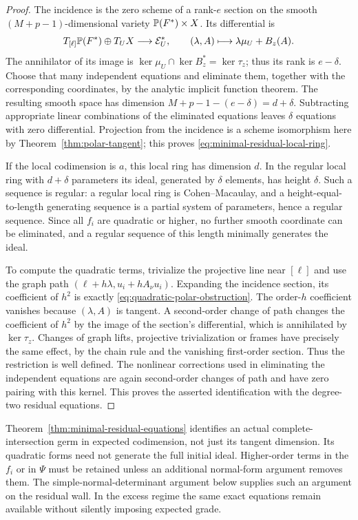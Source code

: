 \begin{proof}
The incidence is the zero scheme of a rank-$e$ section on the smooth
$(M+p-1)$-dimensional variety $\mathbb P(F^*)\times X$.
Its differential is
\[
 T_{[\ell]}\mathbb P(F^*)\oplus T_UX\longrightarrow\mathcal E_U^*,
       \qquad (\lambda,A)\longmapsto\lambda\mu_U+B_z(A).
\]
The annihilator of its image is
$\ker\mu_U\cap\ker B_z^*=\ker\tau_z$; thus its rank is
$e-\delta$. Choose that many independent equations and eliminate
them, together with the corresponding coordinates, by the analytic
implicit function theorem. The resulting smooth space has dimension
$M+p-1-(e-\delta)=d+\delta$. Subtracting appropriate linear
combinations of the eliminated equations leaves $\delta$ equations
with zero differential. Projection from the incidence is a scheme
isomorphism here by Theorem~\ref{thm:polar-tangent}; this proves
\eqref{eq:minimal-residual-local-ring}.

If the local codimension is $a$, this local ring has dimension $d$.
In the regular local ring with $d+\delta$ parameters its ideal,
generated by $\delta$ elements, has height $\delta$. Such a
sequence is regular: a regular local ring is Cohen--Macaulay, and
a height-equal-to-length generating sequence is a partial system of
parameters, hence a regular sequence. Since all $f_i$ are quadratic
or higher, no further smooth coordinate can be eliminated, and a
regular sequence of this length minimally generates the ideal.

To compute the quadratic terms, trivialize the projective line near
$[\ell]$ and use the graph path
$(\ell+h\lambda,u_i+hA_\nu u_i)$. Expanding the incidence section,
its coefficient of $h^2$ is exactly
\eqref{eq:quadratic-polar-obstruction}. The order-$h$ coefficient
vanishes because $(\lambda,A)$ is tangent. A second-order change of
path changes the coefficient of $h^2$ by the image of the section's
differential, which is annihilated by $\ker\tau_z$. Changes of graph
lifts, projective trivialization or frames have precisely the same
effect, by the chain rule and the vanishing first-order section.
Thus the restriction is well defined. The nonlinear corrections used
in eliminating the independent equations are again second-order
changes of path and have zero pairing with this kernel. This proves
the asserted identification with the degree-two residual equations.
\end{proof}

\begin{remark}\label{rem:higher-residual-terms}
Theorem~\ref{thm:minimal-residual-equations} identifies an actual
complete-intersection germ in expected codimension, not just its
tangent dimension. Its quadratic forms need not generate the full
initial ideal. Higher-order terms in the $f_i$ or in $\Psi$ must be
retained unless an additional normal-form argument removes them.
The simple-normal-determinant argument below supplies such an
argument on the residual wall. In the excess regime the same exact
equations remain available without silently imposing expected grade.
\end{remark}

